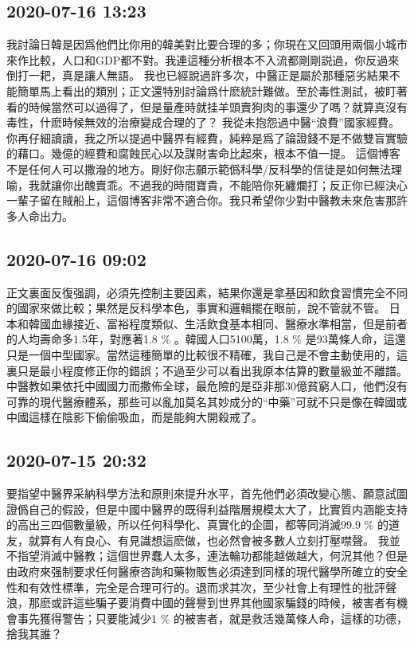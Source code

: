 \documentclass[twocolumn]{ctexart}
\begin{document}
\subsection*{2020-07-16 13:23}

我討論日韓是因爲他們比你用的韓美對比要合理的多；你現在又回頭用兩個小城市來作比較，人口和GDP都不對。我連這種分析根本不入流都剛剛説過，你反過來倒打一耙，真是讓人無語。
我也已經說過許多次，中醫正是屬於那種惡劣結果不能簡單馬上看出的類別；正文還特別討論爲什麽統計難做。至於毒性測試，被盯著看的時候當然可以過得了，但是量產時就挂羊頭賣狗肉的事還少了嗎？就算真沒有毒性，什麽時候無效的治療變成合理的了？
我從未抱怨過中醫“浪費”國家經費。你再仔細讀讀，我之所以提過中醫界有經費，純粹是爲了論證錢不是不做雙盲實驗的藉口。幾億的經費和腐蝕民心以及謀財害命比起來，根本不值一提。
這個博客不是任何人可以撒潑的地方。剛好你志願示範僞科學/反科學的信徒是如何無法理喻，我就讓你出醜賣乖。不過我的時間寶貴，不能陪你死纏爛打；反正你已經決心一輩子留在賊船上，這個博客非常不適合你。我只希望你少對中醫教未來危害那許多人命出力。
\subsection*{2020-07-16 09:02}

正文裏面反復强調，必須先控制主要因素，結果你還是拿基因和飲食習慣完全不同的國家來做比較；果然是反科學本色，事實和邏輯擺在眼前，說不管就不管。
日本和韓國血緣接近、富裕程度類似、生活飲食基本相同、醫療水準相當，但是前者的人均壽命多1.5年，對應著1.8 \% 。韓國人口5100萬，1.8 \% 是93萬條人命，這還只是一個中型國家。當然這種簡單的比較很不精確，我自己是不會主動使用的，這裏只是最小程度修正你的錯誤；不過至少可以看出我原本估算的數量級並不離譜。
中醫教如果依托中國國力而撒佈全球，最危險的是亞非那30億貧窮人口，他們沒有可靠的現代醫療體系，那些可以亂加莫名其妙成分的“中藥”可就不只是像在韓國或中國這樣在陰影下偷偷吸血，而是能夠大開殺戒了。
\subsection*{2020-07-15 20:32}

要指望中醫界采納科學方法和原則來提升水平，首先他們必須改變心態、願意試圖證僞自己的假設，但是中國中醫界的既得利益階層規模太大了，比實質内涵能支持的高出三四個數量級，所以任何科學化、真實化的企圖，都等同消滅99.9 \% 的道友，就算有人有良心、有見識想這麽做，也必然會被多數人立刻打壓噤聲。
我並不指望消滅中醫教；這個世界蠢人太多，連法輪功都能越做越大，何況其他？但是由政府來强制要求任何醫療咨詢和藥物販售必須達到同樣的現代醫學所確立的安全性和有效性標準，完全是合理可行的。退而求其次，至少社會上有理性的批評聲浪，那麽或許這些騙子要消費中國的聲譽到世界其他國家騙錢的時候，被害者有機會事先獲得警告；只要能減少1 \% 的被害者，就是救活幾萬條人命，這樣的功德，捨我其誰？
\end{document}
